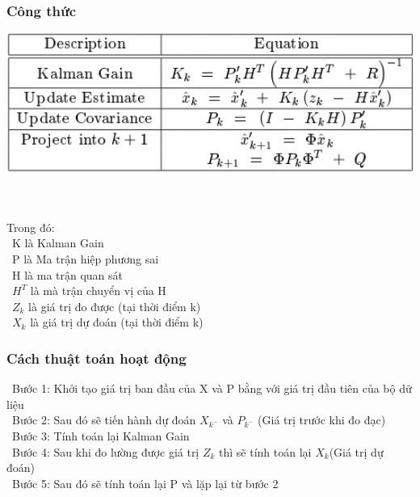\subsubsection{Công thức}

\begin{minipage}{0.45\textwidth}
\centering
\includegraphics[width=1\textwidth]{resources/chapter-4/kalman-fillter-1.png}
\end{minipage}
\\ \\
Trong đó:\\
    \indent\textbullet\ K là Kalman Gain\\
    \indent\textbullet\ P là Ma trận hiệp phương sai\\
    \indent\textbullet\ H là ma trận quan sát \\
    \indent\textbullet\ \(H^T\) là mà trận chuyển vị của H\\
    \indent\textbullet\ \(Z_k\) là giá trị đo được (tại thời điểm k)\\
    \indent\textbullet\ \(X_k\) là giá trị dự đoán (tại thời điểm k)

\subsubsection{Cách thuật toán hoạt động}
    \indent\textbullet\ Bước 1: Khởi tạo giá trị ban đầu của X và P bằng với giá trị đầu tiên của bộ dữ liệu\\
    \indent\textbullet\ Bước 2: Sau đó sẽ tiến hành dự đoán \(X_{k^-}\) và \(P_{k^-}\) (Giá trị trước khi đo đạc)\\
    \indent\textbullet\ Bước 3: Tính toán lại Kalman Gain\\
    \indent\textbullet\ Bước 4: Sau khi đo lường được giá trị \(Z_k\) thì sẽ tính toán lại \(X_k\)(Giá trị dự đoán)\\
    \indent\textbullet\ Bước 5: Sau đó sẽ tính toán lại P và lặp lại từ bước 2\\

